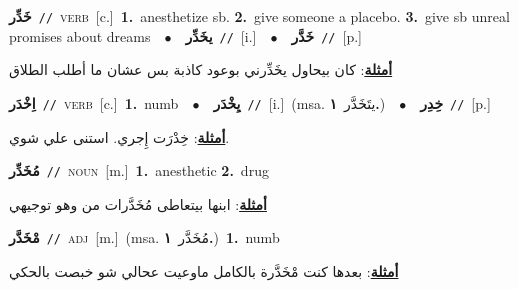 \documentclass[10pt,a4paper,twoside]{article} %
\begin{document}
\begin{multicols}{2}
{{{{{{{{{{\setlength\topsep{0pt}\textbf{\foreignlanguage{arabic}{خَدِّر}}\ {\color{gray}\texttt{//}\color{black}}\ \textsc{verb}\ [c.]\ \textbf{1.}~anesthetize sb.  \textbf{2.}~give someone a placebo.  \textbf{3.}~give sb unreal promises about dreams\ \ $\bullet$\ \ \setlength\topsep{0pt}\textbf{\foreignlanguage{arabic}{يخَدِّر}}\ {\color{gray}\texttt{//}\color{black}}\ [i.]\ \ $\bullet$\ \ \setlength\topsep{0pt}\textbf{\foreignlanguage{arabic}{خَدَّر}}\ {\color{gray}\texttt{//}\color{black}}\ [p.]\  \begin{flushright}\color{gray}\foreignlanguage{arabic}{\textbf{\underline{\foreignlanguage{arabic}{أمثلة}}}: كان بيحاول يخَدِّرني بوعود كاذبة بس عشان ما أطلب الطلاق}\end{flushright}\color{black}} \vspace{2mm}

{\setlength\topsep{0pt}\textbf{\foreignlanguage{arabic}{اِخْدَر}}\ {\color{gray}\texttt{//}\color{black}}\ \textsc{verb}\ [c.]\ \textbf{1.}~numb\ \ $\bullet$\ \ \setlength\topsep{0pt}\textbf{\foreignlanguage{arabic}{يِخْدَر}}\ {\color{gray}\texttt{//}\color{black}}\ [i.]\ \color{gray}(msa. \foreignlanguage{arabic}{يتَخَدَّر}~\foreignlanguage{arabic}{\textbf{١.}})\color{black}\ \ $\bullet$\ \ \setlength\topsep{0pt}\textbf{\foreignlanguage{arabic}{خِدِر}}\ {\color{gray}\texttt{//}\color{black}}\ [p.]\  \begin{flushright}\color{gray}\foreignlanguage{arabic}{\textbf{\underline{\foreignlanguage{arabic}{أمثلة}}}: خِدْرَت إِجري. استنى علي شوي.}\end{flushright}\color{black}} \vspace{2mm}

{\setlength\topsep{0pt}\textbf{\foreignlanguage{arabic}{مُخَدِّر}}\ {\color{gray}\texttt{//}\color{black}}\ \textsc{noun}\ [m.]\ \textbf{1.}~anesthetic  \textbf{2.}~drug\  \begin{flushright}\color{gray}\foreignlanguage{arabic}{\textbf{\underline{\foreignlanguage{arabic}{أمثلة}}}: ابنها بيتعاطى مُخَدَّرات من وهو توجيهي}\end{flushright}\color{black}} \vspace{2mm}

{\setlength\topsep{0pt}\textbf{\foreignlanguage{arabic}{مْخَدَّر}}\ {\color{gray}\texttt{//}\color{black}}\ \textsc{adj}\ [m.]\ \color{gray}(msa. \foreignlanguage{arabic}{مُخَدَّر}~\foreignlanguage{arabic}{\textbf{١.}})\color{black}\ \textbf{1.}~numb\  \begin{flushright}\color{gray}\foreignlanguage{arabic}{\textbf{\underline{\foreignlanguage{arabic}{أمثلة}}}: بعدها كنت مْخَدَّرة بالكامل ماوعيت عحالي شو خبصت بالحكي}\end{flushright}\color{black}} \vspace{2mm}

}}}}}}}}}
\end{multicols}
\end{document}
